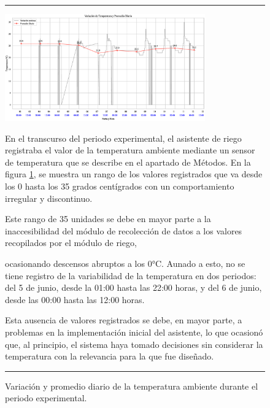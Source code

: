 \documentclass[pdflatex,sn-mathphys-num]{sn-jnl}%
\theoremstyle{thmstyleone}%
\theoremstyle{thmstyletwo}%
\theoremstyle{thmstylethree}%
\begin{document}
\begin{figure}[H]
    \hrule
    \vspace{0.2cm}
    \centering
    \includegraphics[width=0.77\textwidth]{assets/temperatura_continua_y_promedio.eps}
    \caption{Variación y promedio diario de la temperatura ambiente durante el periodo experimental.}
    \label{fig:temperatura_promedio}

    \vspace{0.4cm}

    \noindent
    \begin{minipage}[t]{0.49\textwidth}
        \justifying
         En el transcurso del periodo experimental, el asistente de riego registraba el valor de la temperatura ambiente mediante un sensor de temperatura que se describe en el apartado de Métodos. En la figura \ref{fig:temperatura_promedio}, se muestra un rango de los valores registrados que va desde los 0 hasta los 35 grados centígrados con un comportamiento irregular y discontinuo.

        Este rango de 35 unidades se debe en mayor parte a la inaccesibilidad del módulo de recolección de datos a los valores recopilados por el módulo de riego,

    \end{minipage}%
    \hfill
    \begin{minipage}[t]{0.49\textwidth}
        \justifying
        \noindent ocasionando descensos abruptos a los 0°C. Aunado a esto, no se tiene registro de la variabilidad de la temperatura en dos periodos: del 5 de junio, desde la 01:00 hasta las 22:00 horas, y del 6 de junio, desde las 00:00 hasta las 12:00 horas.

        Esta ausencia de valores registrados se debe, en mayor parte, a problemas en la implementación inicial del asistente, lo que ocasionó que, al principio, el sistema haya tomado decisiones sin considerar la temperatura con la relevancia para la que fue diseñado.   
	\end{minipage}

    \vspace{0.5cm}
    \hrule
\end{figure}
\end{document}
